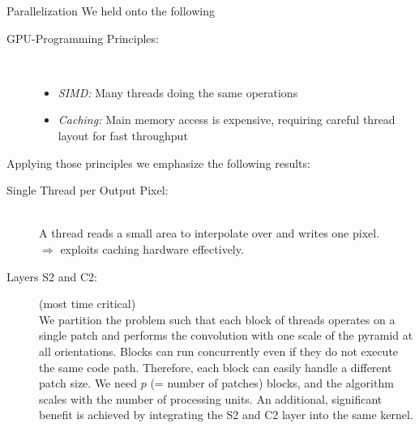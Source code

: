 \documentclass[final]{beamer}
\begin{document}
\begin{frame}{}
\begin{columns}[t]
\begin{column}{.48\linewidth}
        \begin{block}{Parallelization}
We held onto the following
\begin{description}
\item[GPU-Programming Principles:]~
	\begin{itemize}
		\item \emph{SIMD:} Many threads doing the same operations
		\item \emph{Caching:} Main memory access is expensive, requiring careful thread layout for fast throughput
	\end{itemize}
\end{description}
Applying those principles we emphasize the following results:
\begin{description}
\item[Single Thread per Output Pixel:]~\\
A thread reads a small area to interpolate over and writes one pixel.\\
$\Rightarrow$ exploits caching hardware effectively.

\item[Layers S2 and C2:] (most time critical)\\
We partition the problem such that each block of threads operates on a
single patch and performs the convolution with one scale of the
pyramid at all orientations. Blocks can run concurrently even if they do not execute the same code path. 
Therefore, each block can easily handle a different patch size. We need $p$ (= number of patches) blocks, and the algorithm scales
with the number of processing units. \newline
An additional, significant benefit is achieved by integrating the S2
and C2 layer into the same kernel.

\end{description}

        \end{block}        
        
        
      \end{column}
      
      

\end{columns}
\end{frame}
\end{document}
